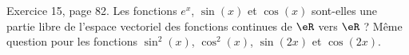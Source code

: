 \begin{exercice}\label{exoLineraire0026}

	Exercice 15, page 82. Les fonctions $e^x$, $\sin(x)$ et $\cos(x)$ sont-elles une partie libre de l'espace vectoriel des fonctions continues de $\eR$ vers $\eR$ ? Même question pour les fonctions $\sin^2(x)$, $\cos^2(x)$, $\sin(2x)$ et $\cos(2x)$.


\end{exercice}
